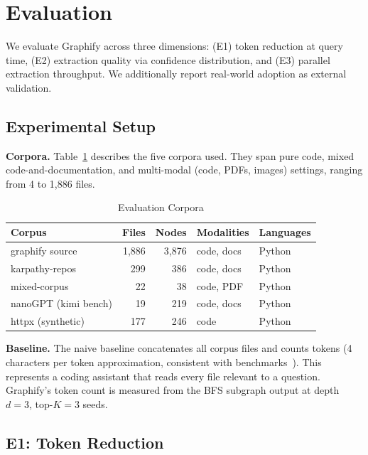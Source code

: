 \section{Evaluation}
\label{sec:eval}

We evaluate Graphify across three dimensions: (E1) token reduction at query
time, (E2) extraction quality via confidence distribution, and (E3) parallel
extraction throughput. We additionally report real-world adoption as external
validation.

\subsection{Experimental Setup}

\textbf{Corpora.} Table~\ref{tab:corpora} describes the five corpora used.
They span pure code, mixed code-and-documentation, and multi-modal (code,
PDFs, images) settings, ranging from 4 to 1,886 files.

\begin{table}[h]
\centering
\caption{Evaluation Corpora}
\label{tab:corpora}
\begin{tabular}{lrrll}
\toprule
\textbf{Corpus} & \textbf{Files} & \textbf{Nodes} & \textbf{Modalities} & \textbf{Languages} \\
\midrule
graphify source      & 1,886 & 3,876 & code, docs         & Python       \\
karpathy-repos       &   299 &   386 & code, docs         & Python       \\
mixed-corpus         &    22 &    38 & code, PDF          & Python       \\
nanoGPT (kimi bench) &    19 &   219 & code, docs         & Python       \\
httpx (synthetic)    &   177 &   246 & code               & Python       \\
\bottomrule
\end{tabular}
\end{table}

\textbf{Baseline.} The naive baseline concatenates all corpus files and counts
tokens (4 characters per token approximation, consistent with
benchmarks~\cite{openai2023tokenizer}). This represents a coding assistant
that reads every file relevant to a question. Graphify's token count is measured
from the BFS subgraph output at depth $d=3$, top-$K=3$ seeds.

\subsection{E1: Token Reduction}

